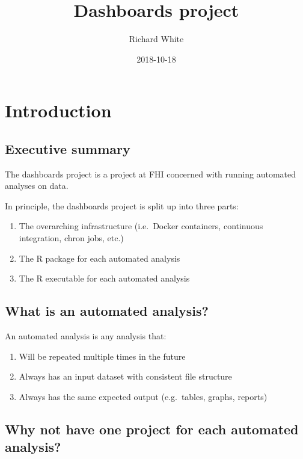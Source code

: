 \documentclass[12pt,]{article}
\title{Dashboards project}
\author{Richard White}
\date{2018-10-18}
\providecommand{\tightlist}{%
  \setlength{\itemsep}{0pt}\setlength{\parskip}{0pt}}
\begin{document}
\maketitle

{
\hypersetup{linkcolor=black}
\setcounter{tocdepth}{2}
\tableofcontents
}
\listoftables
\listoffigures
\section{Introduction}\label{introduction}

\subsection{Executive summary}\label{executive-summary}

The dashboards project is a project at FHI concerned with running
automated analyses on data.

In principle, the dashboards project is split up into three parts:

\begin{enumerate}
\def\labelenumi{\arabic{enumi}.}
\tightlist
\item
  The overarching infrastructure (i.e.~Docker containers, continuous
  integration, chron jobs, etc.)
\item
  The R package for each automated analysis
\item
  The R executable for each automated analysis
\end{enumerate}

\subsection{What is an automated
analysis?}\label{what-is-an-automated-analysis}

An automated analysis is any analysis that:

\begin{enumerate}
\def\labelenumi{\arabic{enumi}.}
\tightlist
\item
  Will be repeated multiple times in the future
\item
  Always has an input dataset with consistent file structure
\item
  Always has the same expected output (e.g.~tables, graphs, reports)
\end{enumerate}

\subsection{Why not have one project for each automated
analysis?}\label{why-not-have-one-project-for-each-automated-analysis}
\end{document}
